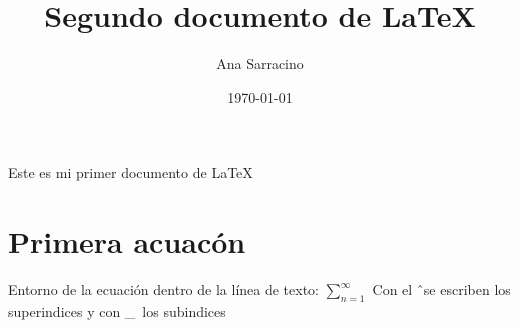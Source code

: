 \documentclass{article}
\title{Segundo documento de LaTeX}
\author{Ana Sarracino}
\date{\today}
\begin{document}
\maketitle
Este es mi primer documento de \LaTeX
\section{Primera acuac\'on}
Entorno de la  ecuaci\'on dentro de la l\'inea de texto: $\sum^{\infty}_{n=1}$
Con el \^\ se escriben los superindices y con \_\ los subindices
\end{document}
